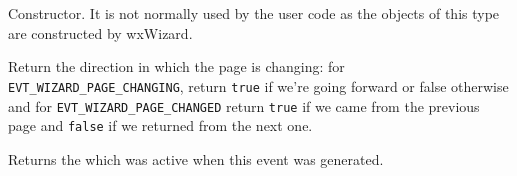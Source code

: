 \label{wxwizardeventwxwizardevent}


Constructor. It is not normally used by the user code as the objects of this
type are constructed by wxWizard.

\label{wxwizardeventgetdirection}


Return the direction in which the page is changing: for {\tt
EVT\_WIZARD\_PAGE\_CHANGING}, return {\tt true} if we're going forward or
false otherwise and for {\tt EVT\_WIZARD\_PAGE\_CHANGED} return {\tt true} if
we came from the previous page and {\tt false} if we returned from the next
one.

\label{wxwizardeventgetpage}


Returns the  which was active when this
event was generated.

